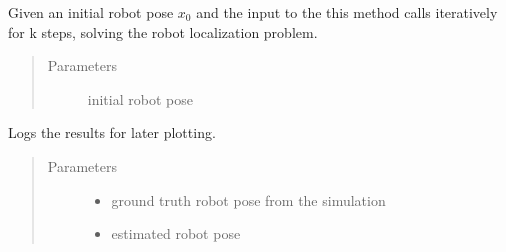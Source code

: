 \documentclass[letterpaper,10pt,english]{sphinxmanual}
\begin{document}
\begin{fulllineitems}
\begin{fulllineitems}
\label{\detokenize{Localization:Localization.Localization.LocalizationLoop}}
\sphinxAtStartPar
Given an initial robot pose \(x_0\) and the input to the  this method calls iteratively  for k steps, solving the robot localization problem.
\begin{quote}\begin{description}
\item[{Parameters}] \leavevmode
\sphinxAtStartPar
{} \textendash{} initial robot pose

\end{description}\end{quote}

\end{fulllineitems}


\begin{fulllineitems}
\label{\detokenize{Localization:Localization.Localization.Log}}
\sphinxAtStartPar
Logs the results for later plotting.
\begin{quote}\begin{description}
\item[{Parameters}] \leavevmode\begin{itemize}
\item {} 
\sphinxAtStartPar
{} \textendash{} ground truth robot pose from the simulation

\item {} 
\sphinxAtStartPar
{} \textendash{} estimated robot pose

\end{itemize}

\end{description}\end{quote}

\end{fulllineitems}



\end{fulllineitems}
\end{document}
